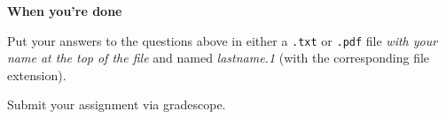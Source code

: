 \documentclass[11pt]{article}
\begin{document}
\textbf{\Large{When you're done}}

Put your answers to the questions above in either a \texttt{.txt} or \texttt{.pdf} file \emph{with your name at the top of the file} and named \emph{lastname.1} (with the corresponding file extension).

Submit your assignment via gradescope.
\end{document}
